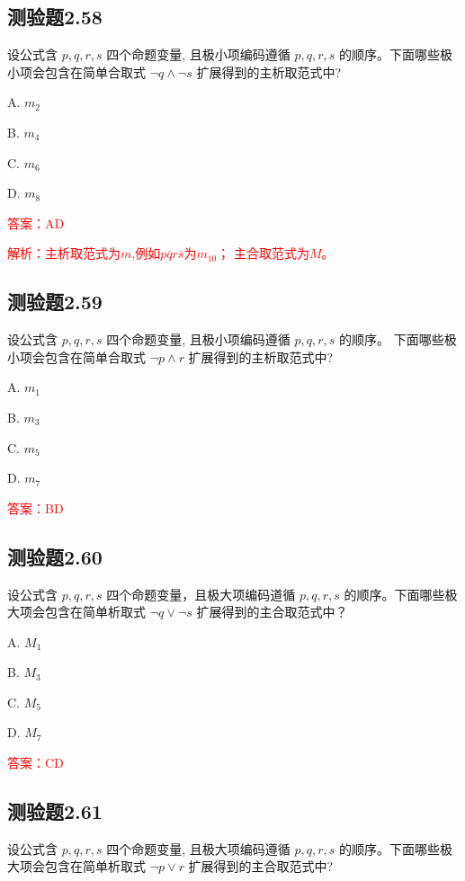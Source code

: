 \documentclass[UTF8, heading=true]{ctexart}
\begin{document}
\subsection{测验题2.58}

设公式含 $p, q, r, s$ 四个命题变量, 且极小项编码遵循 $p, q, r, s$ 的顺序。下面哪些极小项会包含在简单合取式 $\neg q \wedge \neg s$ 扩展得到的主析取范式中?

A. $ m_2$

B. $m_4$

C. $ m_6$

D. $ m_8$

\textcolor{red}{答案：AD}

\textcolor{red}{解析：主析取范式为$m$,例如$p \overline{q} r \overline{s}$为$m_{10}$；
主合取范式为$M$。}

\subsection{测验题2.59}

设公式含 $p, q, r, s$ 四个命题变量, 
且极小项编码遵循 $p, q, r, s$ 的顺序。
下面哪些极小项会包含在简单合取式 $\neg p \wedge r$ 
扩展得到的主析取范式中?

A. $ m_1$

B. $m_3$

C. $ m_5$

D. $ m_7$

\textcolor{red}{答案：BD}

\subsection{测验题2.60}

设公式含 $p, q, r, s$ 四个命题变量，且极大项编码道循 $p, q, r, s$ 的顺序。下面哪些极大项会包含在简单析取式 $\neg q \vee \neg s$ 扩展得到的主合取范式中？

A. $M_1$

B. $M_3$

C. $M_5$

D. $M_7$

\textcolor{red}{答案：CD}

\subsection{测验题2.61}

设公式含 $p, q, r, s$ 四个命题变量, 且极大项编码遵循 $p, q, r, s$ 的顺序。下面哪些极大项会包含在简单析取式 
$\neg p \vee r$ 扩展得到的主合取范式中?
\end{document}

